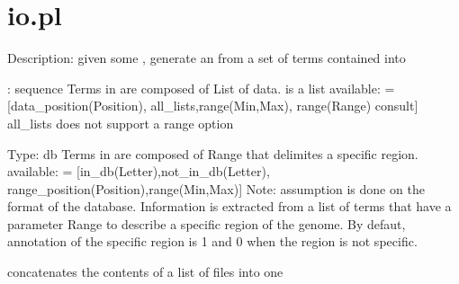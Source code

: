 


\section{io.pl}

\label{sec:io}

\begin{description}
Description: given some , generate an  from a set of terms contained into 

\begin{center}
: sequence
Terms in  are composed of List of data.
 is a list
 available:  = [data_position(Position),
all_lists,range(Min,Max),
range(Range)
consult]
all_lists does not support a range option
\end{center}

\begin{center}
Type: db
Terms in  are composed of Range that delimites a specific region.
 available:  = [in_db(Letter),not_in_db(Letter),
range_position(Position),range(Min,Max)]
Note: assumption is done on the format of the database. Information is extracted from a list
of terms that have a parameter Range to describe a specific region of the genome.
By defaut, annotation of the specific region is 1 and 0 when the region is not specific.
\end{center}

concatenates the contents of a list of files into one
\end{description}

